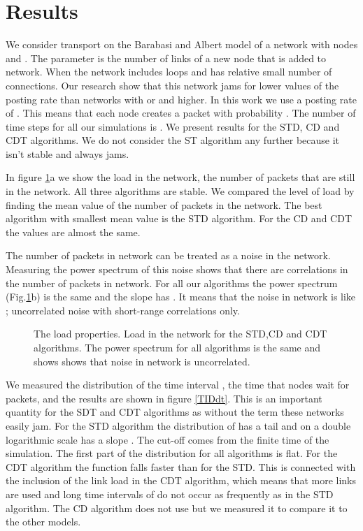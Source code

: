 \documentclass[runningheads]{llncs}
\begin{document}
\section{Results}
We consider transport on the Barabasi and Albert model of a network
\cite{Albert_base} with  nodes and . The parameter 
is the number of links of a new node that is added to network. When
 the network includes loops and has relative small number of
connections. Our research show that this network jams for lower
values of the posting rate than networks with  or  and
higher. In this work we use a posting rate of . This means
that each node creates a packet with probability . The number
of time steps for all our simulations is . We present
results for the STD, CD and CDT algorithms. We do not consider the
ST algorithm any further because it isn't stable and always jams.

In figure \ref{LoadProp}a we show the load in the network,
the number of packets that are still in the network.  All
three algorithms are stable. We compared the level of load by
finding the mean value of the number of packets in the network. The
best algorithm with smallest mean value is the STD algorithm. For
the CD and CDT the values are almost the same.

The number of packets in network can be treated as a noise in the
network. Measuring the power spectrum of this noise shows that there
are correlations in the number of packets in network. For all our
algorithms the power spectrum (Fig.\ref{LoadProp}b) is the same and
the slope has .  It means that the noise in network is like
; uncorrelated noise with short-range correlations only.
\begin{figure}
\centerline{} \caption{The load
properties.  Load in the network for the STD,CD and CDT
algorithms.  The power spectrum for all algorithms is the same and shows
shows that noise in network is uncorrelated.} \label{LoadProp}
\end{figure}
We measured the distribution of the time interval , the
time that nodes wait for packets, and the results are shown in
figure \ref{TIDdt}. This is an important quantity for the SDT and
CDT algorithms as without the  term these networks
easily jam. For the STD algorithm the distribution of 
has a tail and on a double logarithmic scale has a slope .
The cut-off comes from the finite time of the simulation. The first
part of the distribution for all algorithms is flat. For the CDT
algorithm the function falls faster than for the STD. This is
connected with the inclusion of the link load in the CDT algorithm,
which means that more links are used and long time intervals of
 do not occur as frequently as in the STD algorithm.
The CD algorithm does not use  but we measured it to
compare it to the other models.
\end{document}
